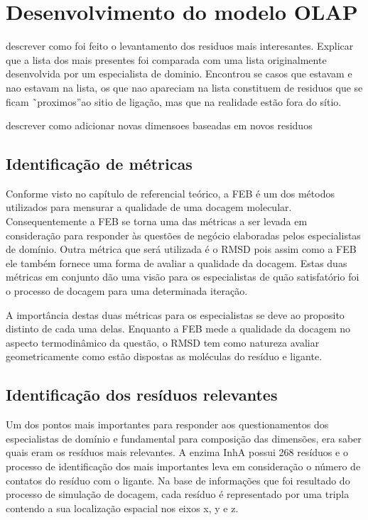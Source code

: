 \chapter{Desenvolvimento do modelo OLAP}

descrever como foi feito o levantamento dos residuos mais interesantes. Explicar que a lista dos mais presentes foi comparada com uma lista originalmente desenvolvida por um especialista de dominio. Encontrou se casos que estavam e nao estavam na lista, os que nao apareciam na lista constituem de residuos que se ficam ˜proximos”ao sitio de ligação, mas que na realidade estão fora do sítio.

descrever como  adicionar novas dimensoes baseadas em novos residuos

\section{Identificação de métricas}
Conforme visto no capítulo de referencial teórico, a FEB é um dos métodos utilizados para mensurar a qualidade de uma docagem molecular. Consequentemente a FEB se torna uma das métricas a ser levada em consideração para responder às questões de negócio elaboradas pelos especialistas de domínio. Outra métrica que será utilizada é o RMSD pois assim como a FEB ele também fornece uma forma de avaliar a qualidade da docagem. Estas duas métricas em conjunto dão uma visão para os especialistas de quão satisfatório foi o processo de docagem para uma determinada iteração.

A importância destas duas métricas para os especialistas se deve ao proposito distinto de cada uma delas. Enquanto a FEB mede a qualidade da docagem no aspecto termodinâmico da questão, o RMSD tem como natureza avaliar geometricamente como estão dispostas as moléculas do resíduo e ligante.

\section{Identificação dos resíduos relevantes}
Um dos pontos mais importantes para responder aos questionamentos dos especialistas de domínio e fundamental para composição das dimensões, era saber quais eram os resíduos mais relevantes. A enzima InhA possui 268 resíduos \cite{KARANADUNOSM09} e o processo de identificação dos mais importantes leva em consideração o número de contatos do resíduo com o ligante. Na base de informações que foi resultado do processo de simulação de docagem, cada resíduo é representado por uma tripla contendo a sua localização espacial nos eixos x, y e z.

